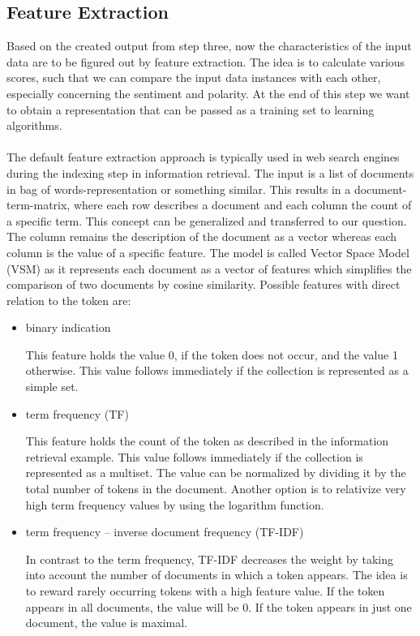 \documentclass[article,type=msc,colorback,accentcolor=tud7b]{tudthesis}
\begin{document}
  \subsection{Feature Extraction}
    Based on the created output from step three, now the characteristics of the input data are to be figured out by feature extraction. The idea is to calculate various scores, such that we can compare the input data instances with each other, especially concerning the sentiment and polarity. At the end of this step we want to obtain a representation that can be passed as a training set to learning algorithms. \\\\
    The default feature extraction approach is typically used in web search engines during the indexing step in information retrieval. The input is a list of documents in bag of words-representation or something similar. This results in a document-term-matrix, where each row describes a document and each column the count of a specific term. This concept can be generalized and transferred to our question. The column remains the description of the document as a vector whereas each column is the value of a specific feature. The model is called Vector Space Model (VSM) as it represents each document as a vector of features which simplifies the comparison of two documents by cosine similarity. Possible features with direct relation to the token are:
    \begin{itemize}
      \item binary indication
      
        This feature holds the value 0, if the token does not occur, and the value 1 otherwise. This value follows immediately if the collection is represented as a simple set.
      \item term frequency (TF)
      
        This feature holds the count of the token as described in the information retrieval example. This value follows immediately if the collection is represented as a multiset. The value can be normalized by dividing it by the total number of tokens in the document. Another option is to relativize very high term frequency values by using the logarithm function.
      \item term frequency – inverse document frequency (TF-IDF)
      
        In contrast to the term frequency, TF-IDF decreases the weight by taking into account the number of documents in which a token appears. The idea is to reward rarely occurring tokens with a high feature value. If the token appears in all documents, the value will be 0. If the token appears in just one document, the value is maximal.
    \end{itemize}
\end{document}
